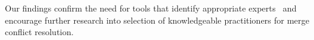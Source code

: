 

Our findings confirm the need for tools that identify appropriate experts~\cite{CostaSarma} and encourage further research into selection of knowledgeable practitioners for merge conflict resolution.



